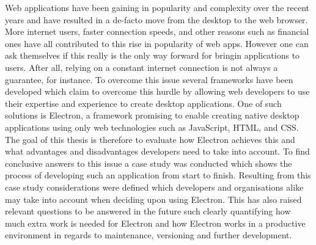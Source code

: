 Web applications have been gaining in popularity and complexity
over the recent years and have resulted in a de-facto move from 
the desktop to the web browser. 
More internet users, faster connection speeds, and other reasons
such as financial ones have all contributed to this rise in 
popularity of web apps. 
However one can ask themselves if this really is the only way 
forward for bringin applications to users. 
After all, relying on a constant internet connection is not 
always a guarantee, for instance.
To overcome this issue several frameworks have been developed 
which claim to overcome this hurdle by allowing web developers 
to use their expertise and experience to create desktop 
applications. 
One of such solutions is Electron, a framework promising to 
enable creating native desktop applications using only web 
technologies such as JavaScript, HTML, and CSS. 
The goal of this thesis is therefore to evaluate how Electron
achieves this and what advantages and disadvantages developers 
need to take into account.
To find conclusive answers to this issue a case study was conducted which shows the 
process of developing such an application from start to finish. 
Resulting from this case study considerations were defined which developers 
and organisations alike may take into account when deciding upon 
using Electron. 
This has also raised relevant questions to be answered in the future
such clearly quantifying how much extra work is needed for Electron 
and how Electron works in a productive environment in regards to 
maintenance, versioning and further development. 